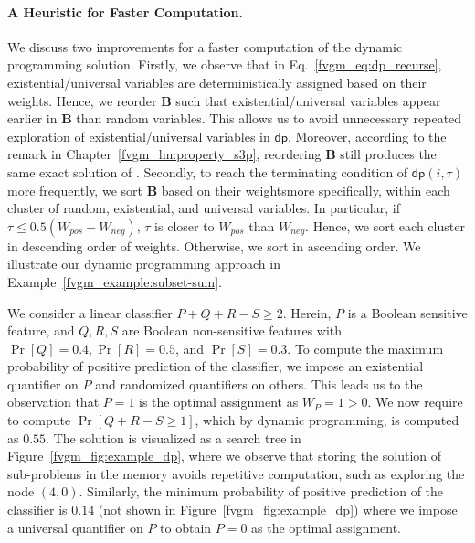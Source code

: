 \paragraph{A Heuristic for Faster Computation.} 
We discuss two improvements for a faster computation of the dynamic programming solution. Firstly, we observe that in Eq.~\eqref{fvgm_eq:dp_recurse}, existential/universal variables are deterministically  assigned based on their weights. Hence, we reorder $ \mathbf{B} $ such that existential/universal variables appear earlier in $ \mathbf{B} $ than random variables. This allows us to avoid unnecessary repeated exploration of existential/universal variables in $ \mathsf{dp} $. Moreover, according to the remark in Chapter~\ref{fvgm_lm:property_s3p}, reordering $ \mathbf{B} $ still produces the same exact solution of {\stochastic}. Secondly, to reach the terminating condition of $ \mathsf{dp}(i, \tau) $ more frequently, we sort $ \mathbf{B} $ based on their weights\textemdash more specifically, within each cluster of random, existential, and universal variables. In particular, if $ \tau \le 0.5(W_{pos} - W_{neg}) $, $ \tau $ is closer to $ W_{pos} $ than $ W_{neg} $. Hence, we sort each cluster in descending order of weights. Otherwise,  we sort in ascending order. We illustrate our dynamic programming approach in Example~\ref{fvgm_example:subset-sum}.
	
\begin{example}\label{fvgm_example:subset-sum}
\normalfont
We consider a linear classifier $ P + Q + R - S \ge 2$. Herein, $ P $ is a Boolean sensitive feature, and $ Q, R, S $ are Boolean non-sensitive features with $ \Pr[Q] = 0.4,  \Pr[R] = 0.5 $, and $ \Pr[S] = 0.3 $. To compute the maximum probability of positive prediction of the classifier,  we impose an existential quantifier on $P$ and randomized quantifiers on others. This leads us to the observation that $ P = 1 $ is the optimal assignment as $ W_P = 1 > 0 $. We now require to compute $ \Pr[Q + R - S \ge 1] $, which by dynamic programming, is computed as $ 0.55 $. The solution is visualized as a search tree in Figure~\ref{fvgm_fig:example_dp}, where we observe that storing the solution of sub-problems in the memory avoids repetitive computation, such as exploring the node $ (4,0) $. Similarly, the minimum probability of positive prediction  of the classifier is $ 0.14 $ (not shown in Figure~\ref{fvgm_fig:example_dp}) where we impose a universal quantifier on $P$ to obtain $ P = 0 $ as the optimal assignment. 
\end{example}

	
	